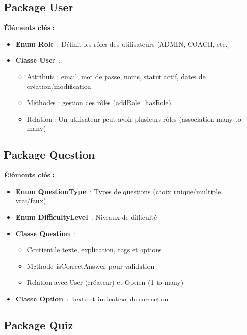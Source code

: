 \documentclass[12pt,a4paper,twoside]{report}
\begin{document}
\hypertarget{package-user}{%
\subsection{Package User}\label{package-user}}

\textbf{Éléments clés :}

\begin{itemize}
\item
  \textbf{Enum Role}~: Définit les rôles des utilisateurs (ADMIN, COACH,
  etc.)
\item
  \textbf{Classe User}~:

  \begin{itemize}
  \item
    Attributs : email, mot de passe, noms, statut actif, dates de
    création/modification
  \item
    Méthodes : gestion des rôles (addRole,~hasRole)
  \item
    Relation : Un utilisateur peut avoir plusieurs rôles (association
    many-to-many)
  \end{itemize}
\end{itemize}

\hypertarget{package-question}{%
\subsection{Package Question}\label{package-question}}

\textbf{Éléments clés :}

\begin{itemize}
\item
  \textbf{Enum QuestionType}~: Types de questions (choix
  unique/multiple, vrai/faux)
\item
  \textbf{Enum DifficultyLevel}~: Niveaux de difficulté
\item
  \textbf{Classe Question}~:

  \begin{itemize}
  \item
    Contient le texte, explication, tags et options
  \item
    Méthode~isCorrectAnswer~pour validation
  \item
    Relation avec User (créateur) et Option (1-to-many)
  \end{itemize}
\item
  \textbf{Classe Option}~: Texte et indicateur de correction
\end{itemize}

\hypertarget{package-quiz}{%
\subsection{Package Quiz}\label{package-quiz}}
\end{document}
